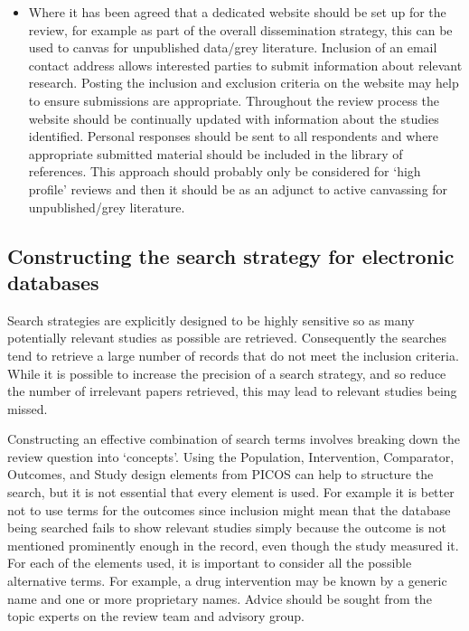 \documentclass[
  10pt,
  a4paper,
  DIV=11,
  numbers=noendperiod]{scrreprt}
\providecommand{\tightlist}{%
  \setlength{\itemsep}{0pt}\setlength{\parskip}{0pt}}
\begin{document}
\begin{itemize}
  \begin{itemize}
  \tightlist
  \item
    Where it has been agreed that a dedicated website should be set up
    for the review, for example as part of the overall dissemination
    strategy, this can be used to canvas for unpublished data/grey
    literature. Inclusion of an email contact address allows interested
    parties to submit information about relevant research. Posting the
    inclusion and exclusion criteria on the website may help to ensure
    submissions are appropriate. Throughout the review process the
    website should be continually updated with information about the
    studies identified. Personal responses should be sent to all
    respondents and where appropriate submitted material should be
    included in the library of references. This approach should probably
    only be considered for `high profile' reviews and then it should be
    as an adjunct to active canvassing for unpublished/grey literature.
  \end{itemize}
\end{itemize}

\subsection{Constructing the search strategy for electronic
databases}\label{constructing-the-search-strategy-for-electronic-databases}

Search strategies are explicitly designed to be highly sensitive so as
many potentially relevant studies as possible are retrieved.
Consequently the searches tend to retrieve a large number of records
that do not meet the inclusion criteria. While it is possible to
increase the precision of a search strategy, and so reduce the number of
irrelevant papers retrieved, this may lead to relevant studies being
missed.

Constructing an effective combination of search terms involves breaking
down the review question into `concepts'. Using the Population,
Intervention, Comparator, Outcomes, and Study design elements from PICOS
can help to structure the search, but it is not essential that every
element is used. For example it is better not to use terms for the
outcomes since inclusion might mean that the database being searched
fails to show relevant studies simply because the outcome is not
mentioned prominently enough in the record, even though the study
measured it. For each of the elements used, it is important to consider
all the possible alternative terms. For example, a drug intervention may
be known by a generic name and one or more proprietary names. Advice
should be sought from the topic experts on the review team and advisory
group.
\end{document}
